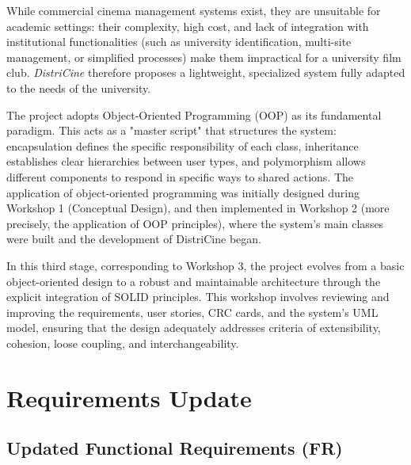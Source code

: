 \documentclass[12pt, letterpaper]{article}
\begin{document}
While commercial cinema management systems exist, they are unsuitable for academic settings: their complexity, high cost, and lack of integration with institutional functionalities (such as university identification, multi-site management, or simplified processes) make them impractical for a university film club. \emph{DistriCine} therefore proposes a lightweight, specialized system fully adapted to the needs of the university.

The project adopts Object-Oriented Programming (OOP) as its fundamental paradigm. This acts as a "master script" that structures the system: encapsulation defines the specific responsibility of each class, inheritance establishes clear hierarchies between user types, and polymorphism allows different components to respond in specific ways to shared actions. The application of object-oriented programming was initially designed during Workshop 1 (Conceptual Design), and then implemented in Workshop 2 (more precisely, the application of OOP principles), where the system's main classes were built and the development of DistriCine began.

In this third stage, corresponding to Workshop 3, the project evolves from a basic object-oriented design to a robust and maintainable architecture through the explicit integration of SOLID principles. This workshop involves reviewing and improving the requirements, user stories, CRC cards, and the system's UML model, ensuring that the design adequately addresses criteria of extensibility, cohesion, loose coupling, and interchangeability.

\section{Requirements Update}

\subsection{Updated Functional Requirements (FR)}
\end{document}
